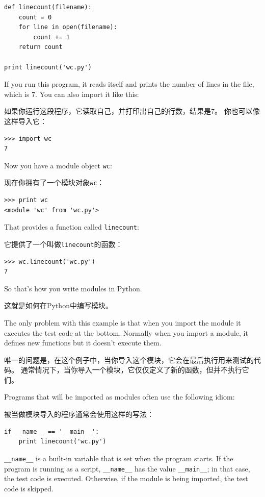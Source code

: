 \documentclass[10pt]{book}
\begin{document}
\begin{CJK}{UTF8}{gbsn}
\begin{verbatim}
def linecount(filename):
    count = 0
    for line in open(filename):
        count += 1
    return count

print linecount('wc.py')
\end{verbatim}
%
If you run this program, it reads itself and prints the number
of lines in the file, which is 7.
You can also import it like this:

如果你运行这段程序，它读取自己，并打印出自己的行数，结果是7。
你也可以像这样导入它：

\begin{verbatim}
>>> import wc
7
\end{verbatim}
%
Now you have a module object {\tt wc}:

现在你拥有了一个模块对象{\tt wc}：

\begin{verbatim}
>>> print wc
<module 'wc' from 'wc.py'>
\end{verbatim}
%
That provides a function called \verb"linecount":

它提供了一个叫做\verb"linecount"的函数：

\begin{verbatim}
>>> wc.linecount('wc.py')
7
\end{verbatim}
%
So that's how you write modules in Python.

这就是如何在Python中编写模块。

The only problem with this example is that when you import
the module it executes the test code at the bottom.  Normally
when you import a module, it defines new functions but it
doesn't execute them.

唯一的问题是，在这个例子中，当你导入这个模块，它会在最后执行用来测试的代码。
通常情况下，当你导入一个模块，它仅仅定义了新的函数，但并不执行它们。

Programs that will be imported as modules often
use the following idiom:

被当做模块导入的程序通常会使用这样的写法：

\begin{verbatim}
if __name__ == '__main__':
    print linecount('wc.py')
\end{verbatim}
%
\verb"__name__" is a built-in variable that is set when the
program starts.  If the program is running as a script,
\verb"__name__" has the value \verb"__main__"; in that
case, the test code is executed.  Otherwise,
if the module is being imported, the test code is skipped.


\end{CJK}
\end{document}
